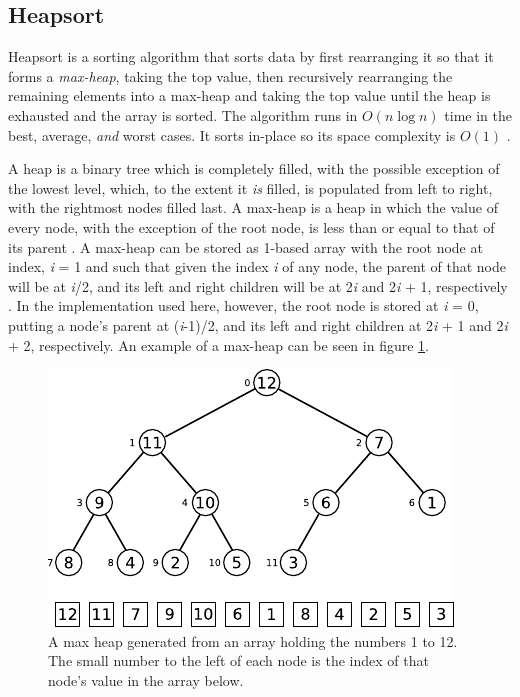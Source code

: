\documentclass[12pt, a4paper]{article}
\begin{document}
\subsection{Heapsort}

Heapsort is a sorting algorithm that sorts data by first rearranging it so that it forms a \emph{max-heap}, taking the top value, then recursively rearranging the remaining elements into a max-heap and taking the top value until the heap is exhausted and the array is sorted. The algorithm runs in $O(n\log n)$ time in the best, average, \emph{and} worst cases. It sorts in-place so its space complexity is $O(1)$ \autocite[129]{cormen01}.

A heap is a binary tree which is completely filled, with the possible exception of the lowest level, which, to the extent it  \emph{is} filled, is populated from left to right, with the rightmost nodes filled last. A max-heap is a heap in which the value of every node, with the exception of the root node, is less than or equal to that of its parent \autocite[127-129]{cormen01}. A max-heap can be stored as 1-based array with the root node at index, \emph{i} = 1 and such that given the index \emph{i} of any node, the parent of that node will be at \emph{i}/2, and its left and right children will be at 2\emph{i} and 2\emph{i} + 1, respectively \autocites[128]{cormen01}[148]{bentley:pearls}. In the implementation used here, however, the root node is stored at \emph{i} = 0, putting a node's parent at (\emph{i}-1)/2, and its left and right children at 2\emph{i} + 1 and 2\emph{i} + 2, respectively. An example of a max-heap can be seen in figure \ref{fig:heap}.


\begin{figure}
    \centering
    \includegraphics{heap.pdf}
    \caption{\label{fig:heap}A max heap generated from an array holding the numbers 1 to 12. The small number to the left of each node is the index of that node's value in the array below.}
\end{figure}
\end{document}
